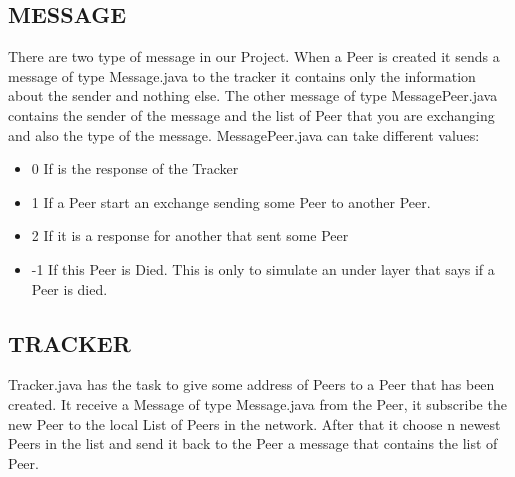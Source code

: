 \documentclass[a4paper,12pt,notitlepage]{article} %
\begin{document}
\subsection{MESSAGE}
	There are two type of message in our Project. When a Peer is 	created it sends a message of type Message.java to 
the tracker it contains only the information about the sender and nothing else. The other message of type MessagePeer.java 
contains the sender of the message and the list of Peer that you are exchanging and also the type of the message. 
MessagePeer.java can take different values:
\begin{itemize}
  \item 0 If is the response of the Tracker
  \item 1 If a Peer start an exchange sending some Peer to another Peer.
  \item 2 If it is a response for another that sent some Peer
  \item -1 If this Peer is Died. This is only to simulate an under layer that says if a Peer is died.
\end{itemize}

\subsection{TRACKER}
	Tracker.java has the task to give some address of Peers to a Peer that has been created. It receive a Message of 
type Message.java from the Peer, it subscribe the new Peer to the local List of Peers in the network. After that it choose 
n newest Peers in the list and send it back to the Peer a message that contains the list of Peer.
\end{document}
